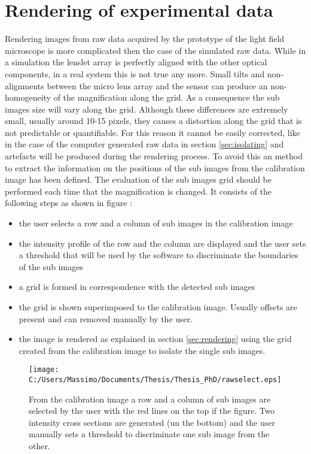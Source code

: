 \section{Rendering of experimental data}
Rendering images from raw data acquired by the prototype of the light field microscope is more complicated then the case of the simulated raw data. While in a simulation the lenslet array is perfectly aligned with the other optical components, in a real system this is not true any more. Small tilts and non-alignments between the micro lens array and the sensor can produce an non-homogeneity of the magnification along the grid. As a consequence the sub images size will vary along the grid. Although these differences are extremely small, usually around 10-15 pixels, they causes a distortion along the grid that is not predictable or quantifiable. For this reason it cannot be easily corrected, like in the case of the computer generated raw data in section \ref{sec:isolating} and artefacts will be produced during the rendering process. To avoid this an method to extract the information on the positions of the sub images from the calibration image has been defined. The evaluation of the sub images grid should be performed each time that the magnification is changed. It consists of the following steps as shown in figure :
\begin{itemize}
	\item the user selects a row and a column of sub images in the calibration image 
	\item the intensity profile of the row and the column are displayed and the user sets a threshold that will be used by the software to discriminate the boundaries of the sub images
	\item a grid is formed in correspondence with the detected sub images 
	\item the grid is shown superimposed to the calibration image. Usually offsets are present and can removed manually by the user.
	\item the image is rendered as explained in section \ref{sec:rendering} using the grid created from the calibration image to isolate the single sub images.
\end{itemize}
\begin{figure}[H]
	\centering
	\texttt{[image: C:/Users/Massimo/Documents/Thesis/Thesis\_PhD/rawselect.eps]}
	\caption{\label{fig:renderingreal} From the calibration image a row and a column of sub images are selected by the user with the red lines on the top if the figure. Two intensity cross sections are generated (un the bottom) and the user manually sets a threshold to discriminate one sub image from the other.}
\end{figure}
